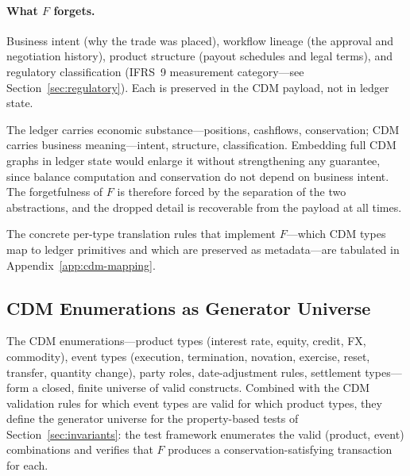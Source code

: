 \paragraph{What \texorpdfstring{$F$}{F} forgets.} Business intent (why the trade was placed), workflow lineage (the approval and negotiation history), product structure (payout schedules and legal terms), and regulatory classification (IFRS~9 measurement category---see Section~\ref{sec:regulatory}). Each is preserved in the CDM payload, not in ledger state.

\begin{principle}
The ledger carries economic substance---positions, cashflows, conservation; CDM carries business meaning---intent, structure, classification. Embedding full CDM graphs in ledger state would enlarge it without strengthening any guarantee, since balance computation and conservation do not depend on business intent. The forgetfulness of $F$ is therefore forced by the separation of the two abstractions, and the dropped detail is recoverable from the payload at all times.
\end{principle}

The concrete per-type translation rules that implement $F$---which CDM types map to ledger primitives and which are preserved as metadata---are tabulated in Appendix~\ref{app:cdm-mapping}.

\subsection{CDM Enumerations as Generator Universe}

The CDM enumerations---product types (interest rate, equity, credit, FX, commodity), event types (execution, termination, novation, exercise, reset, transfer, quantity change), party roles, date-adjustment rules, settlement types---form a closed, finite universe of valid constructs. Combined with the CDM validation rules for which event types are valid for which product types, they define the generator universe for the property-based tests of Section~\ref{sec:invariants}: the test framework enumerates the valid (product, event) combinations and verifies that $F$ produces a conservation-satisfying transaction for each.

